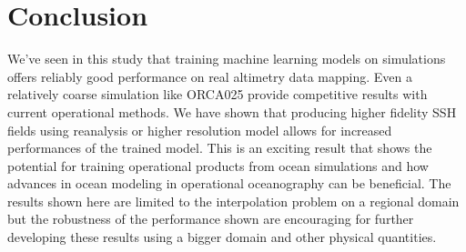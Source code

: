 \documentclass[draft]{agujournal2019}
\begin{document}
\section{Conclusion}
\label{sec:conclusion}
We've seen in this study that training machine learning models on simulations offers reliably good performance on real altimetry data mapping. Even a relatively coarse simulation like ORCA025 provide competitive results with current operational methods. We have shown that producing higher fidelity SSH fields using reanalysis or higher resolution model allows for increased performances of the trained model. This is an exciting result that shows the potential for training operational products from ocean simulations and how advances in ocean modeling in operational oceanography can be beneficial. The results shown here are limited to the interpolation problem on a regional domain but the robustness of the performance shown are encouraging for further developing these results using a bigger domain and other physical quantities.





%
%

%
%
%
%
%
%
%
%
\end{document}
